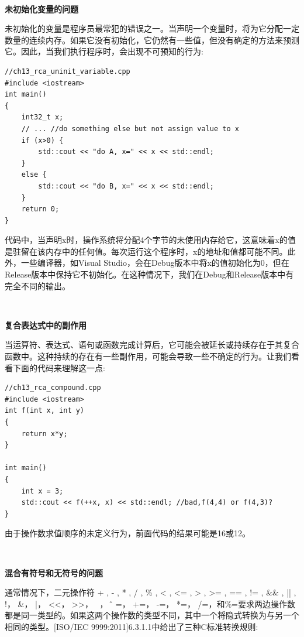 \noindent\textbf{}\ \par
\textbf{未初始化变量的问题} \ \par
未初始化的变量是程序员最常犯的错误之一。当声明一个变量时，将为它分配一定数量的连续内存。如果它没有初始化，它仍然有一些值，但没有确定的方法来预测它。因此，当我们执行程序时，会出现不可预知的行为: \par

\begin{lstlisting}[caption={}]
//ch13_rca_uninit_variable.cpp
#include <iostream>
int main()
{
	int32_t x;
	// ... //do something else but not assign value to x
	if (x>0) {
		std::cout << "do A, x=" << x << std::endl;
	}
	else {
		std::cout << "do B, x=" << x << std::endl;
	}
	return 0;
}
\end{lstlisting}

代码中，当声明x时，操作系统将分配4个字节的未使用内存给它，这意味着x的值是驻留在该内存中的任何值。每次运行这个程序时，x的地址和值都可能不同。此外，一些编译器，如Visual Studio，会在Debug版本中将x的值初始化为0，但在Release版本中保持它不初始化。在这种情况下，我们在Debug和Release版本中有完全不同的输出。 \par

\noindent\textbf{}\ \par
\textbf{复合表达式中的副作用} \ \par
当运算符、表达式、语句或函数完成计算后，它可能会被延长或持续存在于其复合函数中。这种持续的存在有一些副作用，可能会导致一些不确定的行为。让我们看看下面的代码来理解这一点: \par

\begin{lstlisting}[caption={}]
//ch13_rca_compound.cpp
#include <iostream>
int f(int x, int y)
{
	return x*y;
}

int main()
{
	int x = 3;
	std::cout << f(++x, x) << std::endl; //bad,f(4,4) or f(4,3)?
}
\end{lstlisting}

由于操作数求值顺序的未定义行为，前面代码的结果可能是16或12。 \par

\noindent\textbf{}\ \par
\textbf{混合有符号和无符号的问题} \ \par
通常情况下，二元操作符 + , - ,  * ,  / ,  \% ,  < ,  <= , > , >= ,  == ,  != ,  \&\& ,  || ,  !， \&， |， <<， >>， ~， \^， =， +=， -=， *=， /=，和\%=要求两边操作数都是同一类型的。如果这两个操作数的类型不同，其中一个将隐式转换为与另一个相同的类型。[ISO/IEC 9999:2011]6.3.1.1中给出了三种C标准转换规则:\par


